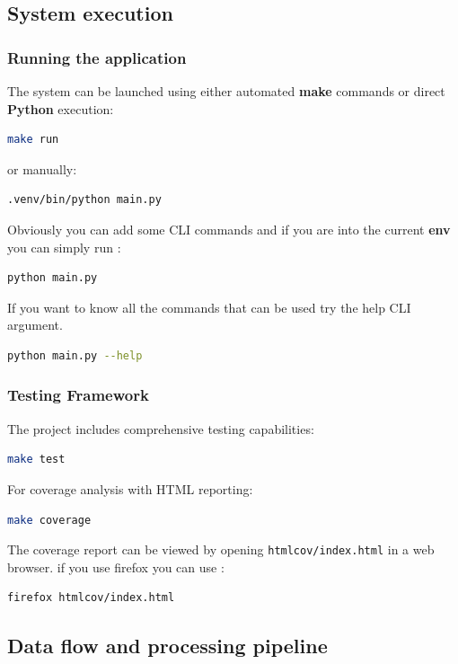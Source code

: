 \subsection{System execution}

\subsubsection{Running the application}
The system can be launched using either automated \textbf{make} commands or direct \textbf{Python} execution:
\begin{lstlisting}[language=bash]
    make run
\end{lstlisting}

or manually:

\begin{lstlisting}[language=bash]
    .venv/bin/python main.py
\end{lstlisting}
Obviously you can add some CLI commands and if you are into the current \textbf{env} you can simply run :


\begin{lstlisting}[language=bash]
    python main.py
\end{lstlisting}
If you want to know all the commands that can be used try the help CLI argument.

\begin{lstlisting}[language=bash]
    python main.py --help
\end{lstlisting}

\subsubsection{Testing Framework}

The project includes comprehensive testing capabilities:

\begin{lstlisting}[language=bash]
    make test
\end{lstlisting}
For coverage analysis with HTML reporting:

\begin{lstlisting}[language=bash]
    make coverage
\end{lstlisting}
The coverage report can be viewed by opening \texttt{htmlcov/index.html} in a web browser.
if you use firefox you can use :
\begin{lstlisting}[language=bash]
    firefox htmlcov/index.html
\end{lstlisting}

\subsection{Data flow and processing pipeline}

